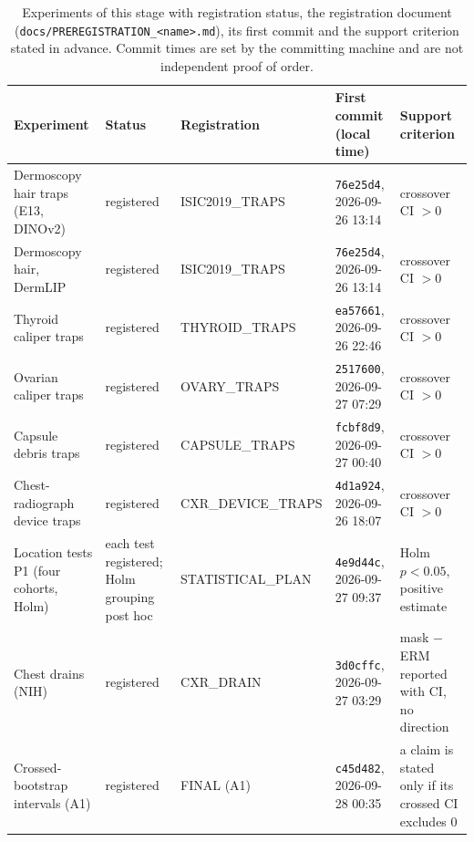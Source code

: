 \begin{table}[H]\centering\scriptsize
\caption{Experiments of this stage with registration status, the registration document (\texttt{docs/PREREGISTRATION\_<name>.md}), its first commit and the support criterion stated in advance. Commit times are set by the committing machine and are not independent proof of order.}\label{tab:exp}
\begin{tabular}{p{3.1cm}p{2.1cm}p{2.4cm}p{3.2cm}p{3.3cm}}\toprule
Experiment & Status & Registration & First commit (local time) & Support criterion \\\midrule
Dermoscopy hair traps (E13, DINOv2) & \ok{} registered & ISIC2019\_\allowbreak{}TRAPS & \texttt{76e25d4}, 2026-09-26 13:14 & crossover CI $>0$ \\
Dermoscopy hair, DermLIP & \ok{} registered & ISIC2019\_\allowbreak{}TRAPS & \texttt{76e25d4}, 2026-09-26 13:14 & crossover CI $>0$ \\
Thyroid caliper traps & \ok{} registered & THYROID\_\allowbreak{}TRAPS & \texttt{ea57661}, 2026-09-26 22:46 & crossover CI $>0$ \\
Ovarian caliper traps & \ok{} registered & OVARY\_\allowbreak{}TRAPS & \texttt{2517600}, 2026-09-27 07:29 & crossover CI $>0$ \\
Capsule debris traps & \ok{} registered & CAPSULE\_\allowbreak{}TRAPS & \texttt{fcbf8d9}, 2026-09-27 00:40 & crossover CI $>0$ \\
Chest-radiograph device traps & \ok{} registered & CXR\_\allowbreak{}DEVICE\_\allowbreak{}TRAPS & \texttt{4d1a924}, 2026-09-26 18:07 & crossover CI $>0$ \\
Location tests P1 (four cohorts, Holm) & \mixed{} each test registered; Holm grouping post hoc & STATISTICAL\_\allowbreak{}PLAN & \texttt{4e9d44c}, 2026-09-27 09:37 & Holm $p<0.05$, positive estimate \\
Chest drains (NIH) & \ok{} registered & CXR\_\allowbreak{}DRAIN & \texttt{3d0cffc}, 2026-09-27 03:29 & mask $-$ ERM reported with CI, no direction \\
Crossed-bootstrap intervals (A1) & \ok{} registered & FINAL (A1) & \texttt{c45d482}, 2026-09-28 00:35 & a claim is stated only if its crossed CI excludes 0 \\
\bottomrule\end{tabular}
\end{table}

